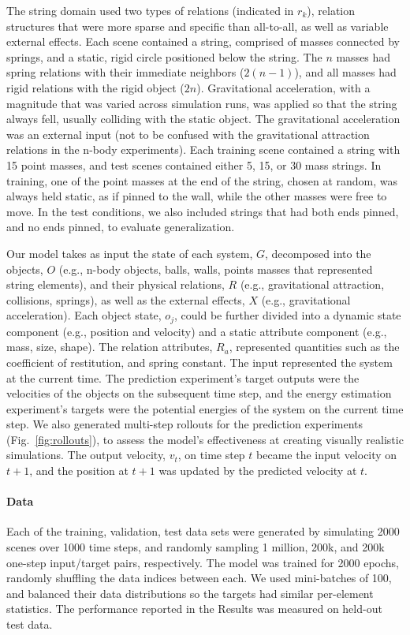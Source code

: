 \documentclass{article}
\begin{document}
The string domain used two types of relations (indicated in $r_k$),
relation structures that were more sparse and specific than
all-to-all, as well as variable external effects. Each scene contained
a string, comprised of masses connected by springs, and a static,
rigid circle positioned below the string. The $n$ masses had spring
relations with their immediate neighbors ($2 (n-1)$), and all masses
had rigid relations with the rigid object ($2 n$). Gravitational
acceleration, with a magnitude that was varied across simulation runs,
was applied so that the string always fell, usually colliding with the
static object. The gravitational acceleration was an external input
(not to be confused with the gravitational attraction relations in the
n-body experiments). Each training scene contained a string with 15
point masses, and test scenes contained either 5, 15, or 30 mass
strings. In training, one of the point masses at the end of the
string, chosen at random, was always held static, as if pinned to the
wall, while the other masses were free to move. In the test
conditions, we also included strings that had both ends pinned, and no
ends pinned, to evaluate generalization.

Our model takes as input the state of each system, $G$, decomposed
into the objects, $O$ (e.g., n-body objects, balls, walls, points
masses that represented string elements), and their physical
relations, $R$ (e.g., gravitational attraction, collisions, springs),
as well as the external effects, $X$ (e.g., gravitational
acceleration). Each object state, $o_j$, could be further divided into
a dynamic state component (e.g., position and velocity) and a static
attribute component (e.g., mass, size, shape). The relation
attributes, $R_a$, represented quantities such as the coefficient of
restitution, and spring constant. The input represented the system at
the current time. The prediction experiment's target outputs were the
velocities of the objects on the subsequent time step, and the energy
estimation experiment's targets were the potential energies of the
system on the current time step. We also generated multi-step rollouts
for the prediction experiments (Fig.~\ref{fig:rollouts}), to assess
the model's effectiveness at creating visually realistic
simulations. The output velocity, $v_t$, on time step $t$ became the
input velocity on $t+1$, and the position at $t+1$ was updated by the
predicted velocity at $t$.

\paragraph{Data}
Each of the training, validation, test data sets were generated by
simulating 2000 scenes over 1000 time steps, and randomly sampling 1
million, 200k, and 200k one-step input/target pairs,
respectively. The model was trained for 2000 epochs, randomly
shuffling the data indices between each. We used mini-batches of 100,
and balanced their data distributions so the targets had similar
per-element statistics. The performance reported in the Results was
measured on held-out test data.
\end{document}
